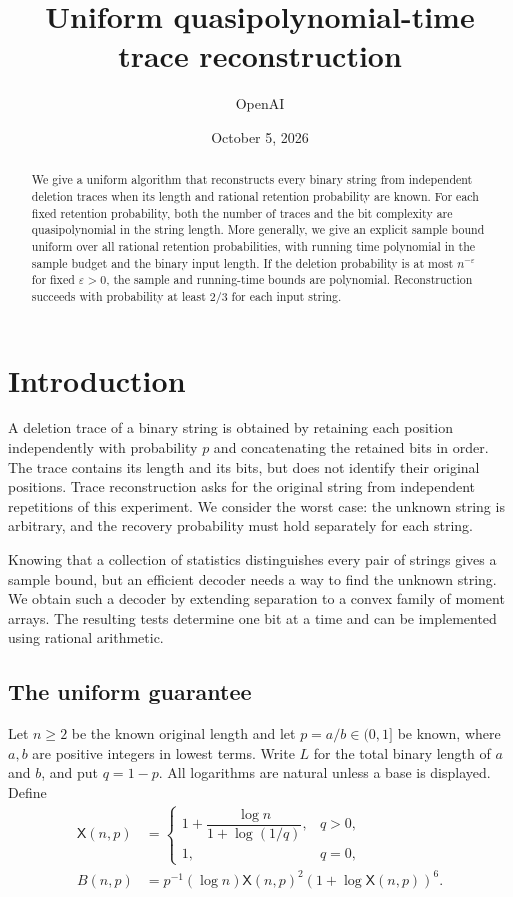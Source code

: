 \documentclass[11pt]{article}
\title{Uniform quasipolynomial-time trace reconstruction}
\author{OpenAI}
\date{October 5, 2026}
\numberwithin{equation}{section}
\theoremstyle{definition}
\theoremstyle{remark}
\begin{document}
\maketitle
\begin{abstract}
We give a uniform algorithm that reconstructs every binary string from
independent deletion traces when its length and rational retention
probability are known. For each fixed retention probability, both the
number of traces and the bit complexity are quasipolynomial in the string
length. More generally, we give an explicit sample bound uniform over
all rational retention probabilities, with running time polynomial in
the sample budget and the binary input length. If the deletion probability
is at most $n^{-\varepsilon}$ for fixed $\varepsilon>0$, the sample and
running-time bounds are polynomial. Reconstruction succeeds with
probability at least $2/3$ for each input string.
\end{abstract}

\section{Introduction}
A deletion trace of a binary string is obtained by retaining each position
independently with probability $p$ and concatenating the retained bits in
order. The trace contains its length and its bits, but does not identify
their original positions. Trace reconstruction asks for the original
string from independent repetitions of this experiment. We consider the
worst case: the unknown string is arbitrary, and the recovery probability
must hold separately for each string.

Knowing that a collection of statistics distinguishes every pair of
strings gives a sample bound, but an efficient decoder needs a way to
find the unknown string. We obtain such a decoder by extending separation
to a convex family of moment arrays. The resulting tests determine one
bit at a time and can be implemented using rational arithmetic.

\subsection{The uniform guarantee}
Let $n\ge2$ be the known original length and let $p=a/b\in(0,1]$ be known,
where $a,b$ are positive integers in lowest terms. Write $L$ for the total
binary length of $a$ and $b$, and put $q=1-p$. All logarithms are natural
unless a base is displayed. Define
\begin{equation}\label{eq:budget}
 \begin{split}
 \mathsf X(n,p)&=
 \begin{cases}
  1+\dfrac{\log n}{1+\log(1/q)},&q>0,\\[3pt]
  1,&q=0,
 \end{cases}\\
 B(n,p)&=p^{-1}(\log n)\mathsf X(n,p)^2
                   (1+\log\mathsf X(n,p))^6.
 \end{split}
\end{equation}
\end{document}

